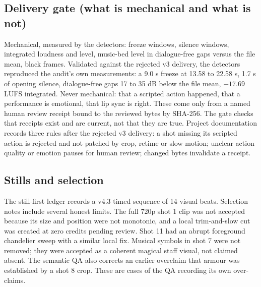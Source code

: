 \documentclass[11pt,a4paper]{article}
\begin{document}
\subsection{Delivery gate (what is mechanical and what is not)}
Mechanical, measured by the detectors: freeze windows, silence windows, integrated loudness and level, music-bed level in dialogue-free gaps versus the file mean, black frames. Validated against the rejected v3 delivery, the detectors reproduced the audit's own measurements: a 9.0 s freeze at 13.58 to 22.58 s, 1.7 s of opening silence, dialogue-free gaps 17 to 35 dB below the file mean, $-17.69$ LUFS integrated. Never mechanical: that a scripted action happened, that a performance is emotional, that lip sync is right. These come only from a named human review receipt bound to the reviewed bytes by SHA-256. The gate checks that receipts exist and are current, not that they are true. Project documentation records three rules after the rejected v3 delivery: a shot missing its scripted action is rejected and not patched by crop, retime or slow motion; unclear action quality or emotion pauses for human review; changed bytes invalidate a receipt.

\subsection{Stills and selection}
The still-first ledger records a v4.3 timed sequence of 14 visual beats. Selection notes include several honest limits. The full 720p shot 1 clip was not accepted because its size and position were not monotonic, and a local trim-and-slow cut was created at zero credits pending review. Shot 11 had an abrupt foreground chandelier sweep with a similar local fix. Musical symbols in shot 7 were not removed; they were accepted as a coherent magical staff visual, not claimed absent. The semantic QA also corrects an earlier overclaim that armour was established by a shot 8 crop. These are cases of the QA recording its own over-claims.
\end{document}
